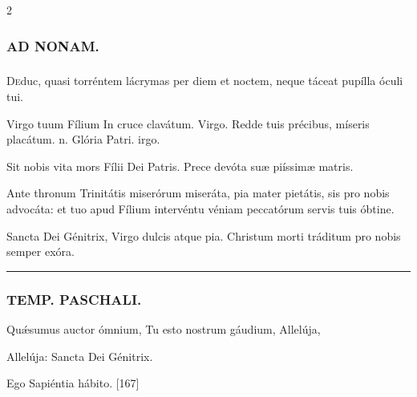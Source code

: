 \documentclass[9pt,twoside]{extarticle}
\begin{document}
\begin{multicols}{2}
\subsubsection*{\center \textsc{AD NONAM.}}
\subsubsection*{}
\lettrine{D}educ, quasi torréntem lácrymas per diem et noctem, neque táceat pupílla óculi tui.

\begin{tightlist}{}
\item {} Virgo tuum Fílium \textred{*} In cruce clavátum. Virgo.  Redde tuis précibus, míseris placátum. n. Glória Patri. irgo.
\item {} Sit nobis vita mors Fílii Dei Patris.  Prece devóta suæ piíssimæ matris.
\item {}
\item {}
\item {} Ante thronum Trinitátis miserórum miseráta, pia mater pietátis, sis pro nobis advocáta: et tuo apud Fílium intervéntu véniam peccatórum servis tuis óbtine.
\item {} Sancta Dei Génitrix, Virgo dulcis atque pia.  Christum morti tráditum pro nobis semper exóra.
\end{tightlist}

\begin{center}\textcolor{red}{\rule{\linewidth}{0.5pt}} \end{center}

\subsubsection*{\center \textsc{TEMP. PASCHALI.}}
\begin{tightlist}{}
\item {} Quǽsumus auctor ómnium,  Tu esto nostrum gáudium,  Allelúja,  
\item {} Allelúja: Sancta Dei Génitrix.
\item {} Ego Sapiéntia hábito. [167]
\end{tightlist}


\end{multicols}
\end{document}
